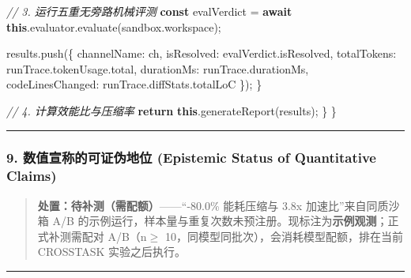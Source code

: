 \documentclass[
]{ctexart}
\newenvironment{Shaded}{}{}
\newcommand{\AttributeTok}[1]{\textcolor[rgb]{0.49,0.56,0.16}{#1}}
\newcommand{\CommentTok}[1]{\textcolor[rgb]{0.38,0.63,0.69}{\textit{#1}}}
\newcommand{\ControlFlowTok}[1]{\textcolor[rgb]{0.00,0.44,0.13}{\textbf{#1}}}
\newcommand{\FunctionTok}[1]{\textcolor[rgb]{0.02,0.16,0.49}{#1}}
\newcommand{\KeywordTok}[1]{\textcolor[rgb]{0.00,0.44,0.13}{\textbf{#1}}}
\newcommand{\NormalTok}[1]{#1}
\newcommand{\OperatorTok}[1]{\textcolor[rgb]{0.40,0.40,0.40}{#1}}
\renewcommand{\_}{\discretionary{}{}{\textunderscore}}
\begin{document}
\begin{Shaded}
\begin{Highlighting}[]
      \CommentTok{// 3. 运行五重无旁路机械评测}
      \KeywordTok{const}\NormalTok{ evalVerdict }\OperatorTok{=} \ControlFlowTok{await} \KeywordTok{this}\OperatorTok{.}\AttributeTok{evaluator}\OperatorTok{.}\FunctionTok{evaluate}\NormalTok{(sandbox}\OperatorTok{.}\AttributeTok{workspace}\NormalTok{)}\OperatorTok{;}

\NormalTok{      results}\OperatorTok{.}\FunctionTok{push}\NormalTok{(\{}
\NormalTok{        channelName}\OperatorTok{:}\NormalTok{ ch}\OperatorTok{,}
\NormalTok{        isResolved}\OperatorTok{:}\NormalTok{ evalVerdict}\OperatorTok{.}\AttributeTok{isResolved}\OperatorTok{,}
\NormalTok{        totalTokens}\OperatorTok{:}\NormalTok{ runTrace}\OperatorTok{.}\AttributeTok{tokenUsage}\OperatorTok{.}\AttributeTok{total}\OperatorTok{,}
\NormalTok{        durationMs}\OperatorTok{:}\NormalTok{ runTrace}\OperatorTok{.}\AttributeTok{durationMs}\OperatorTok{,}
\NormalTok{        codeLinesChanged}\OperatorTok{:}\NormalTok{ runTrace}\OperatorTok{.}\AttributeTok{diffStats}\OperatorTok{.}\AttributeTok{totalLoC}
\NormalTok{      \})}\OperatorTok{;}
\NormalTok{    \}}

    \CommentTok{// 4. 计算效能比与压缩率}
    \ControlFlowTok{return} \KeywordTok{this}\OperatorTok{.}\FunctionTok{generateReport}\NormalTok{(results)}\OperatorTok{;}
\NormalTok{  \}}
\NormalTok{\}}
\end{Highlighting}
\end{Shaded}

\begin{center}\rule{0.5\linewidth}{0.5pt}\end{center}

\subsubsection{9. 数值宣称的可证伪地位 (Epistemic Status of Quantitative
Claims)}\label{ux6570ux503cux5ba3ux79f0ux7684ux53efux8bc1ux4f2aux5730ux4f4d-epistemic-status-of-quantitative-claims-5}

\begin{quote}
\textbf{处置：待补测（需配额）}------``-80.0\% 能耗压缩与 3.8x
加速比''来自同质沙箱 A/B
的示例运行，样本量与重复次数未预注册。现标注为\textbf{示例观测}；正式补测需配对
A/B（n\(\ge\) 10，同模型同批次），会消耗模型配额，排在当前 CROSS\_TASK
实验之后执行。
\end{quote}

\begin{center}\rule{0.5\linewidth}{0.5pt}\end{center}
\end{document}
